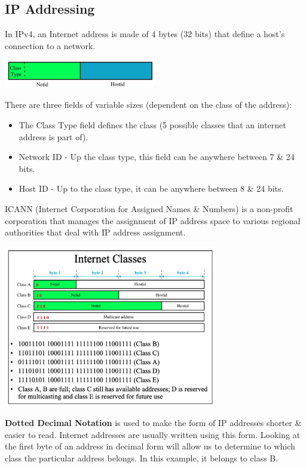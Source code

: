 \documentclass[11pt]{article}
\begin{document}
\subsection{IP Addressing}
In IPv4, an Internet address is made of 4 bytes (32 bits) that define a host's connection to a network.

\begin{center}
    \includegraphics[width=0.5\textwidth]{ipaddressing.png}
\end{center}

There are three fields of variable sizes (dependent on the class of the address): 
\begin{itemize}
    \item   The Class Type field defines the class (5 possible classes that an internet address is part of).
    \item   Network ID - Up the class type, this field can be anywhere between 7 \& 24 bits.
    \item   Host ID - Up to the class type, it can be anywhere between 8 \& 24 bits.
\end{itemize}

ICANN (Internet Corporation for Assigned Names \& Numbers) is a non-profit corporation that manages the assignment of IP address 
space to various regional authorities that deal with IP address assignment.

\begin{center}
    \includegraphics[width=0.7\textwidth]{internetclasses.png}
\end{center}

\textbf{Dotted Decimal Notation} is used to make the form of IP addresses shorter \& easier to read.
Internet addresses are usually written using this form.
Looking at the first byte of an address in decimal form will allow us to determine to which class the particular address belongs.
In this example, it belongs to class B.
\end{document}
